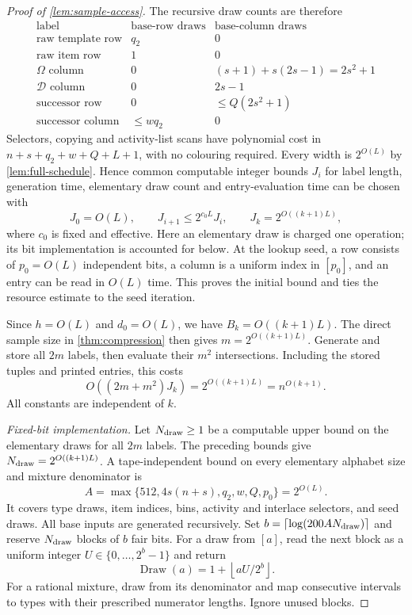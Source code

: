 \documentclass[11pt]{article} \usepackage[utf8]{inputenc}
\theoremstyle{plain} \newtheorem{theorem}{Theorem}[section]
\theoremstyle{definition} \newaliascnt{definition}{theorem}
\newcommand{\ceil}[1]{\left\lceil#1\right\rceil}
\newcommand{\floor}[1]{\left\lfloor#1\right\rfloor}
\begin{document}
\begin{proof}[Proof of \cref{lem:sample-access}]
The recursive draw counts are therefore
\[
\begin{array}{c|c|c}
\text{label}&\text{base-row draws}&\text{base-column draws}\\ \hline
\text{raw template row}&q_2&0\\
\text{raw item row}&1&0\\
\Omega\text{ column}&0&(s+1)+s(2s-1)=2s^2+1\\
\mathcal D\text{ column}&0&2s-1\\
\text{successor row}&0&\le Q(2s^2+1)\\
\text{successor column}&\le wq_2&0
\end{array}
\]
Selectors, copying and activity-list scans have polynomial cost in
$n+s+q_2+w+Q+L+1$, with no colouring required. Every width is $2^{O(L)}$ by
\cref{lem:full-schedule}. Hence common computable integer bounds $J_i$ for
label length, generation time, elementary draw count and entry-evaluation
time can be chosen with
\[
J_0=O(L),\qquad J_{i+1}\le2^{c_0L}J_i,\qquad
J_k=2^{O((k+1)L)},
\]
where $c_0$ is fixed and effective. Here an elementary draw is charged one
operation; its bit implementation is accounted for below. At the lookup seed,
a row consists of $p_0=O(L)$ independent bits, a column is a uniform index in
$[p_0]$, and an entry can be read in $O(L)$ time. This proves the initial bound
and ties the resource estimate to the seed iteration.

Since $h=O(L)$ and $d_0=O(L)$, we have $B_k=O((k+1)L)$. The direct sample
size in \cref{thm:compression} then gives $m=2^{O((k+1)L)}$.
Generate and store all $2m$ labels, then evaluate their $m^2$ intersections.
Including the stored tuples and printed entries, this costs
\[
O((2m+m^2)J_k)=2^{O((k+1)L)}=n^{O(k+1)}.
\]
All constants are independent of $k$.

\emph{Fixed-bit implementation.}
Let $N_{\rm draw}\ge1$ be a computable upper bound on the elementary draws
for all $2m$ labels. The preceding bounds give
$N_{\rm draw}=2^{O((k+1)L)}$. A tape-independent bound on every elementary
alphabet size and mixture denominator is
\[
A=\max\{512,4s(n+s),q_2,w,Q,p_0\}=2^{O(L)}.
\]
It covers type draws, item indices, bins, activity and interlace selectors,
and seed draws. All base inputs are generated recursively.
Set $b=\ceil{\log(200A N_{\rm draw})}$ and reserve $N_{\rm draw}$ blocks of
$b$ fair bits. For a draw from $[a]$, read the next block as a uniform integer
$U\in\{0,\ldots,2^b-1\}$ and return
\begin{equation}\label{eq:rounded-draw}
\operatorname{Draw}(a)=1+\floor{aU/2^b}.
\end{equation}
For a rational mixture, draw from its denominator and map consecutive
intervals to types with their prescribed numerator lengths. Ignore unused
blocks.


\end{proof}
\end{document}

